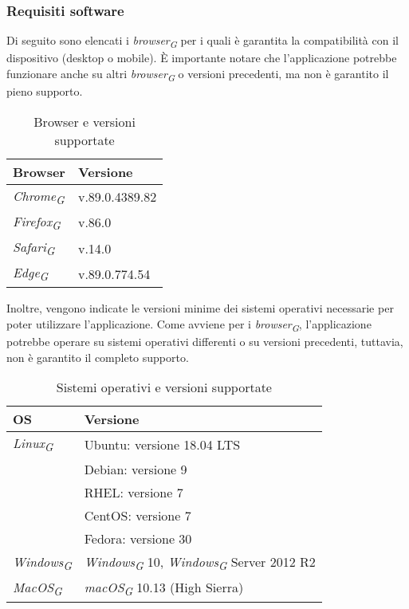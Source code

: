 \subsubsection{Requisiti software}
Di seguito sono elencati i \textit{browser}\textsubscript{\textit{G}} per i quali è garantita la compatibilità con il dispositivo (desktop o mobile). È importante notare che l'applicazione potrebbe funzionare anche su altri \textit{browser}\textsubscript{\textit{G}} o versioni precedenti, ma non è garantito il pieno supporto.  
\begin{table}[H]
    \centering
    \begin{tabular}{ll}
        \toprule
        \textbf{Browser} & \textbf{Versione} \\
        \midrule
        \textit{Chrome}\textsubscript{\textit{G}} & v.89.0.4389.82\\
        \textit{Firefox}\textsubscript{\textit{G}} & v.86.0 \\
        \textit{Safari}\textsubscript{\textit{G}} & v.14.0 \\
        \textit{Edge}\textsubscript{\textit{G}} & v.89.0.774.54 \\
        \bottomrule
    \end{tabular}
    \caption{Browser e versioni supportate}
\end{table}

Inoltre, vengono indicate le versioni minime dei sistemi operativi necessarie per poter utilizzare l'applicazione. Come avviene per i \textit{browser}\textsubscript{\textit{G}}, l'applicazione potrebbe operare su sistemi operativi differenti o su versioni precedenti, tuttavia, non è garantito il completo supporto.\\
\begin{table}[H]
    \centering
    \begin{tabular}{ll}
        \toprule
        \textbf{OS} & \textbf{Versione} \\
        \midrule
        \textit{Linux}\textsubscript{\textit{G}} & Ubuntu: versione 18.04 LTS\\&Debian: versione 9\\& RHEL: versione 7\\& CentOS: versione 7\\& Fedora: versione 30 \\
        \textit{Windows}\textsubscript{\textit{G}} & \textit{Windows}\textsubscript{\textit{G}} 10, \textit{Windows}\textsubscript{\textit{G}} Server 2012 R2 \\
        \textit{MacOS}\textsubscript{\textit{G}} & \textit{macOS}\textsubscript{\textit{G}} 10.13 (High Sierra) \\
        \bottomrule
    \end{tabular}
    \caption{Sistemi operativi e versioni supportate}
\end{table} 